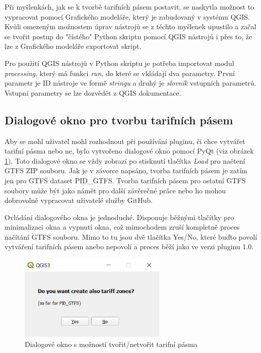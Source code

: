 Při myšlenkách, jak se k tvorbě tarifních pásem postavit,
se naskytla možnost to vypracovat pomocí Grafického modeláře, který je zabudovaný v systému QGIS. 
Kvůli omezeným možnostem úprav nástrojů se z těchto myšlenek upustilo a začal se tvořit postup
do "čístého" Python skriptu pomocí QGIS nástrojů i přes to, že lze z Grafického modeláře exportovat skript. 

Pro použití QGIS nástrojů v Python skriptu je potřeba importovat modul \textit{processing},
který má funkci \textit{run}, do které se vkládají dva parametry. První parametr je ID nástroje
ve formě \textit{stringu} a druhý je \textit{slovník} vstupních parametrů. Vstupní parametry se lze dozvědět
z QGIS dokumentace. \cite{QGIS_docs}

\subsection{Dialogové okno pro tvorbu tarifních pásem}

Aby se mohl uživatel mohl rozhodnout při používání pluginu, či chce vytvářet tarifní pásma nebo ne, bylo vytvořeno
dialogové okno pomocí PyQt (viz obrázek \ref{fig:dialog}). Toto dialogové okno se vždy zobrazí po stisknutí tlačítka
\textit{Load} pro načtení GTFS ZIP souboru. Jak je v závorce napsáno, tvorba tarifních pásem je zatím jen pro GTFS
dataset PID\_GTFS.
Tvorba tarifních pásem pro ostatní GTFS soubory může být jako námět pro další závěrečné práce nebo ho mohou dobrovolně
vypracovat uživatelé služby GitHub.

Ovládání dialogového okna je jednoduché. Disponuje běžnými tlačítky pro minimalizaci okna a vypnutí okna, což mimochodem
zruší kompletně proces načítání GTFS souboru. Mimo to tu jsou dvě tlačítka Yes/No, které buďto povolí vytváření tarifních
pásem anebo nepovolí a proces běží jako ve verzi pluginu 1.0.

\begin{figure}[H] \centering
    \includegraphics[width=200pt]{./pictures/dialog.png}
    \caption[Dialogové okno s možností tvořit/netvořit tarifní pásma]{Dialogové okno s možností tvořit/netvořit tarifní pásma}
	\label{fig:dialog}                                
\end{figure}

